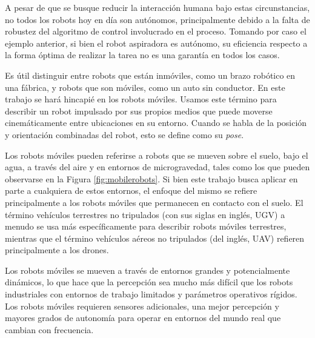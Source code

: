 A pesar de que se busque reducir la interacción humana bajo estas circunstancias, no todos los robots hoy en día son autónomos, principalmente debido a la falta de robustez del algoritmo de control involucrado en el proceso. Tomando por caso el ejemplo anterior, si bien el robot aspiradora es autónomo, su eficiencia respecto a la forma óptima de realizar la tarea no es una garantía en todos los casos.

Es útil distinguir entre robots que están inmóviles, como un brazo robótico en una fábrica, y robots que son móviles, como un auto sin conductor. En este trabajo se hará hincapié en los robots móviles. Usamos este término para describir un robot impulsado por sus propios medios que puede moverse cinemáticamente entre ubicaciones en su entorno. Cuando se habla de la posición y orientación combinadas del robot, esto se define como su \textit{pose}.

Los robots móviles pueden referirse a robots que se mueven sobre el suelo, bajo el agua, a través del aire y en entornos de microgravedad, tales como los que pueden observarse en la Figura \ref{fig:mobilerobots}. Si bien este trabajo busca aplicar en parte a cualquiera de estos entornos, el enfoque del mismo se refiere principalmente a los robots móviles que permanecen en contacto con el suelo. El término vehículos terrestres no tripulados (con sus siglas en inglés, UGV) a menudo se usa más específicamente para describir robots móviles terrestres, mientras que el término vehículos aéreos no tripulados (del inglés, UAV) refieren principalmente a los drones.

Los robots móviles se mueven a través de entornos grandes y potencialmente dinámicos, lo que hace que la percepción sea mucho más difícil que los robots industriales con entornos de trabajo limitados y parámetros operativos rígidos. Los robots móviles requieren sensores adicionales, una mejor percepción y mayores grados de autonomía para operar en entornos del mundo real que cambian con frecuencia.



